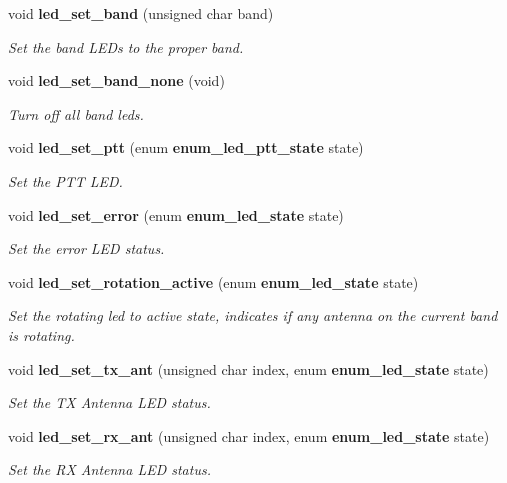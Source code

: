 \begin{CompactItemize}
\item 
void {\bf led\_\-set\_\-band} (unsigned char band)
\begin{CompactList}\small\item\em Set the band LEDs to the proper band. \item\end{CompactList}\item 
void {\bf led\_\-set\_\-band\_\-none} (void)\label{led__control_8c_bfdee5775ab42a7048468f5ad4dd0607}

\begin{CompactList}\small\item\em Turn off all band leds. \item\end{CompactList}\item 
void {\bf led\_\-set\_\-ptt} (enum {\bf enum\_\-led\_\-ptt\_\-state} state)
\begin{CompactList}\small\item\em Set the PTT LED. \item\end{CompactList}\item 
void {\bf led\_\-set\_\-error} (enum {\bf enum\_\-led\_\-state} state)
\begin{CompactList}\small\item\em Set the error LED status. \item\end{CompactList}\item 
void {\bf led\_\-set\_\-rotation\_\-active} (enum {\bf enum\_\-led\_\-state} state)
\begin{CompactList}\small\item\em Set the rotating led to active state, indicates if any antenna on the current band is rotating. \item\end{CompactList}\item 
void {\bf led\_\-set\_\-tx\_\-ant} (unsigned char index, enum {\bf enum\_\-led\_\-state} state)
\begin{CompactList}\small\item\em Set the TX Antenna LED status. \item\end{CompactList}\item 
void {\bf led\_\-set\_\-rx\_\-ant} (unsigned char index, enum {\bf enum\_\-led\_\-state} state)
\begin{CompactList}\small\item\em Set the RX Antenna LED status. \item\end{CompactList}\item 

\end{CompactItemize}
